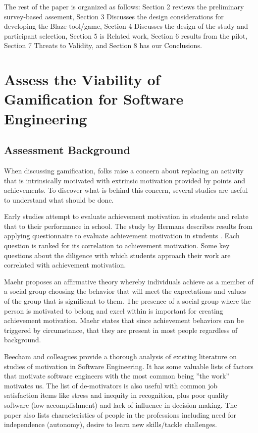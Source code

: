 \documentclass{sig-alternate}
\begin{document}
The rest of the paper is organized as follows:  Section 2 reviews the preliminary survey-based assement, Section 3 Discusses the design considerations for developing the Blaze tool/game, Section 4 Discusses the design of the study and participant selection, Section 5 is Related work, Section 6 results from the pilot, Section 7 Threats to Validity, and Section 8 has our Conclusions.


\section{Assess the Viability of Gamification for Software Engineering}

\subsection{Assessment Background}
When discussing gamification, folks raise a concern about replacing an activity that is intrinsically motivated with extrinsic motivation provided by points and achievements.  To discover what is behind this concern, several studies are useful to understand what should be done. 

Early studies attempt to evaluate achievement motivation in students and relate that to their performance in school.  The study by Hermans describes results from applying questionnaire to evaluate achievement motivation in students \cite{wbsnipes:Hermans1970Questionnaire}.  Each question is ranked for its correlation to achievement motivation. Some key questions about the diligence with which students approach their work are correlated with achievement motivation.  

Maehr proposes an affirmative theory whereby  individuals achieve as a member of a social group choosing the behavior that will meet the expectations and values of the group that is significant to them. \cite{wbsnipes:MaehrCulture}  The presence of a social group where the person is motivated to belong and excel within is important for creating achievement motivation.  Maehr states that since achievement behaviors can be triggered by circumstance, that they are present in most people regardless of background. 

Beecham and colleagues provide a thorough analysis of existing literature on studies of motivation in Software Engineering\cite{wbsnipes:Beecham2008Motivation}. It has some valuable lists of factors that motivate software engineers with the most common being ''the work'' motivates us. The list of de-motivators is also useful with common job satisfaction items like stress and inequity in recognition, plus poor quality software (low accomplishment) and lack of influence in decision making. The paper also lists characteristics of people in the professions including need for independence (autonomy), desire to learn new skills/tackle challenges. 
\end{document}
